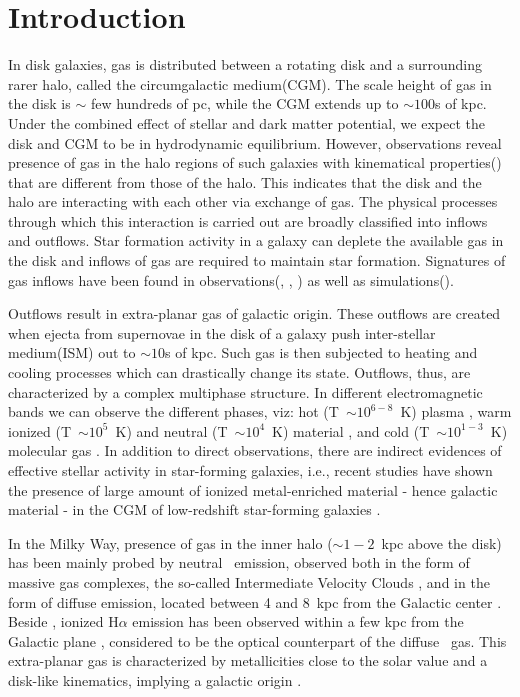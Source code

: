 \documentclass[twocolumn]{aastex62}
\newcommand\hi{\mbox{\ion{H}{1}}}
\begin{document}
\keywords{}

\section{Introduction} \label{sec:intro}
In disk galaxies, gas is distributed between a rotating disk and a surrounding rarer halo, called the circumgalactic medium(CGM). The scale height of gas in the disk is $\sim$ few hundreds of pc, while the CGM extends up to $\sim 100$s of kpc. Under the combined effect of stellar and dark matter potential, we expect the disk and CGM to be in hydrodynamic equilibrium. However, observations reveal presence of gas in the halo regions of such galaxies with kinematical properties(\citep{Wakker+97}) that are different from those of the halo. This indicates that the disk and the halo are interacting with each other via exchange of gas. The physical processes through which this interaction is carried out are broadly classified into inflows and outflows. Star formation activity in a galaxy can deplete the available gas in the disk and inflows of gas are required to maintain star formation. Signatures of gas inflows have been found in observations(\cite{Rubin+12}, \cite{Wong&Blitz04}, \cite{Lehner&Christoper11}) as well as simulations(\cite{Dekel&Yuval06}). 
 
Outflows result in extra-planar gas of galactic origin. These outflows are created when ejecta from supernovae in the disk of a galaxy push inter-stellar medium(ISM) out to $\sim 10$s of kpc. Such gas is then subjected to heating and cooling processes which can drastically change its state. Outflows, thus, are characterized by a complex multiphase structure. In different electromagnetic bands we can observe the different phases, viz: hot (T~$\sim 10^{6-8}$~K) plasma \citep[e.g.,][]{Strickland+04, Strickland&Heckman07}, warm ionized (T~$\sim 10^{5}$~K) and neutral (T~$\sim 10^{4}$~K) material \citep[e.g.,][]{Teng+13,Chen+10,Heckman+15,Chisholm+17}, and cold (T~$\sim 10^{1-3}$~K) molecular gas \citep[e.g.,][]{Walter+02, Bolatto+13}. In addition to direct observations, there are indirect evidences of effective stellar activity in star-forming galaxies, i.e., recent studies have shown the presence of large amount of ionized metal-enriched material - hence galactic material - in the CGM of low-redshift star-forming galaxies \citep[e.g.,][]{Tumlinson+11,Werk+14}.

In the Milky Way, presence of gas in the inner halo ($\sim 1-2$~kpc above the disk) has been mainly probed by neutral \hi\ emission, observed both in the form of massive gas complexes, the so-called Intermediate Velocity Clouds \citep{Wakker01}, and in the form of diffuse emission, located between 4 and 8~kpc from the Galactic center \citep{Lockman02, Ford+10, Peek+11}. Beside \hi, ionized H$\alpha$ emission has been observed within a few kpc from the Galactic plane  \citep[the so-called Reynolds layer][]{Reynolds91,Haffner+03,Gaensler+08}, considered to be the optical counterpart of the diffuse \hi\ gas. This extra-planar gas is characterized by metallicities close to the solar value and a disk-like kinematics, implying a galactic origin \citep[e.g.,][]{vanWoerden+04, Marasco&Fraternali11}.
\end{document}
